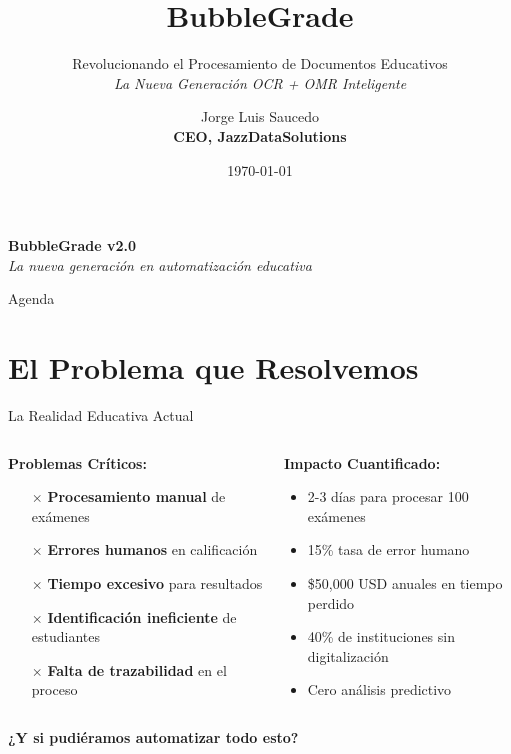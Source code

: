 \documentclass[aspectratio=169,11pt]{beamer}
\title{\textbf{BubbleGrade}}
\subtitle{Revolucionando el Procesamiento de Documentos Educativos\\
\textit{La Nueva Generación OCR + OMR Inteligente}}
\author{Jorge Luis Saucedo\\
\textbf{CEO, JazzDataSolutions}}
\date{\today}
\institute{JazzDataSolutions\\
\textit{Transforming Education Through Technology}}
\begin{document}
\begin{frame}
    \titlepage
    \begin{center}
        \vspace{-0.5cm}
        \large \textcolor{jazzblue}{\textbf{BubbleGrade v2.0}}\\
        \normalsize \textit{La nueva generación en automatización educativa}
    \end{center}
\end{frame}

\begin{frame}{Agenda}
    \tableofcontents
\end{frame}

\section{El Problema que Resolvemos}

\begin{frame}{La Realidad Educativa Actual}
    \begin{columns}
        \begin{column}{0.5\textwidth}
            \textbf{\textcolor{jazzred}{Problemas Críticos:}}
            \begin{itemize}
                \item[$\times$] \textbf{Procesamiento manual} de exámenes
                \item[$\times$] \textbf{Errores humanos} en calificación
                \item[$\times$] \textbf{Tiempo excesivo} para resultados
                \item[$\times$] \textbf{Identificación ineficiente} de estudiantes
                \item[$\times$] \textbf{Falta de trazabilidad} en el proceso
            \end{itemize}
        \end{column}
        \begin{column}{0.5\textwidth}
            \textbf{\textcolor{jazzorange}{Impacto Cuantificado:}}
            \begin{itemize}
                \item 2-3 días para procesar 100 exámenes
                \item 15\% tasa de error humano
                \item \$50,000 USD anuales en tiempo perdido
                \item 40\% de instituciones sin digitalización
                \item Cero análisis predictivo
            \end{itemize}
        \end{column}
    \end{columns}
    
    \vspace{1cm}
    \begin{center}
        \large \textcolor{jazzblue}{\textbf{¿Y si pudiéramos automatizar todo esto?}}
    \end{center}
\end{frame}
\end{document}
